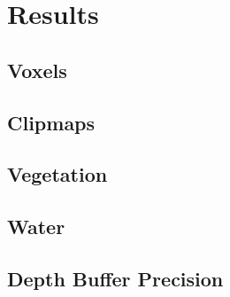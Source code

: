 
\chapter{Results}


\section{Voxels}


\section{Clipmaps}


\section{Vegetation}


\section{Water}


\section{Depth Buffer Precision}

